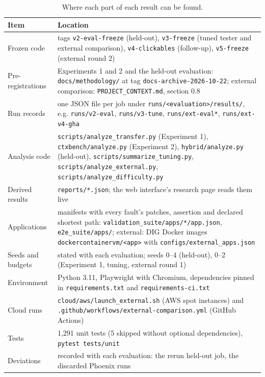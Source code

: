 \begin{table}[H]
\centering
\small
\caption{Where each part of each result can be found.}
\label{tab:repro}
\footnotesize
\renewcommand{\code}[1]{\texttt{#1}}
\begin{tabularx}{\textwidth}{@{}l X@{}}
\toprule
Item & Location \\
\midrule
Frozen code & tags \code{v2-eval-freeze} (held-out), \code{v3-freeze} (tuned tester and external comparison), \code{v4-clickables} (follow-up), \code{v5-freeze} (external round 2) \\
Pre-registrations & Experiments 1 and 2 and the held-out evaluation: \code{docs/methodology/} at tag \code{docs-archive-2026-10-22}; external comparison: \code{PROJECT\_CONTEXT.md}, section 0.8 \\
Run records & one JSON file per job under \code{runs/<evaluation>/results/}, e.g. \code{runs/v2-eval}, \code{runs/v3-tune}, \code{runs/ext-eval*}, \code{runs/ext-v4-gha} \\
Analysis code & \code{scripts/analyze\_transfer.py} (Experiment 1), \code{ctxbench/analyze.py} (Experiment 2), \code{hybrid/analyze.py} (held-out), \code{scripts/summarize\_tuning.py}, \code{scripts/analyze\_external.py}, \code{scripts/analyze\_difficulty.py} \\
Derived results & \code{reports/*.json}; the web interface's research page reads them live \\
Applications & manifests with every fault's patches, assertion and declared shortest path: \code{validation\_suite/apps/*/app.json}, \code{e2e\_suite/apps/}; external: DIG Docker images \code{dockercontainervm/<app>} with \code{configs/external\_apps.json} \\
Seeds and budgets & stated with each evaluation; seeds 0--4 (held-out), 0--2 (Experiment 1, tuning, external round 1) \\
Environment & Python 3.11, Playwright with Chromium, dependencies pinned in \code{requirements.txt} and \code{requirements-ci.txt} \\
Cloud runs & \code{cloud/aws/launch\_external.sh} (AWS spot instances) and \code{.github/workflows/external-comparison.yml} (GitHub Actions) \\
Tests & 1{,}291 unit tests (5 skipped without optional dependencies), \code{pytest tests/unit} \\
Deviations & recorded with each evaluation: the rerun held-out job, the discarded Phoenix runs \\
\bottomrule
\end{tabularx}
\end{table}
